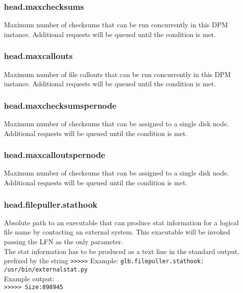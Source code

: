 \documentclass[a4paper,10pt]{scrreprt}
\begin{document}
\subsubsection{head.maxchecksums}

Maximum number of checksums that can be run concurrently in this DPM instance. Additional requests will be queued until the condition is met.\\

\subsubsection{head.maxcallouts}

Maximum number of file callouts that can be run concurrently in this DPM instance. Additional requests will be queued until the condition is met.\\

\subsubsection{head.maxchecksumspernode}

Maximum number of checksums that can be assigned to a single disk node. Additional requests will be queued until the condition is met.\\

\subsubsection{head.maxcalloutspernode}

Maximum number of checksums that can be assigned to a single disk node. Additional requests will be queued until the condition is met.\\



\subsubsection{head.filepuller.stathook}

Absolute path to an executable that can produce stat information for a logical file name by contacting an external system. This exacutable
will be invoked passing the LFN as the only parameter.\\
The stat information has to be produced as a text line in the standard output, prefixed by the string \lstinline">>>>>"
Example:
\lstinline"glb.filepuller.stathook: /usr/bin/externalstat.py"\\
Example output:\\
\lstinline">>>>> Size:898945"
\end{document}
